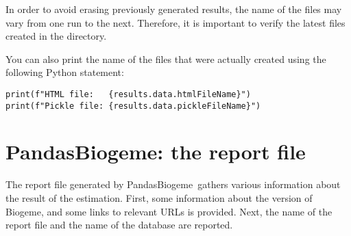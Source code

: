 \documentclass[12pt,a4paper]{article}
\newcommand{\PDBIOGEME}{PandasBiogeme}
\begin{document}
In order to avoid erasing previously generated results, the name of
the files may vary from one run to the next. Therefore,
it is important to verify the latest files created in the directory. 

You can also print the name of the files that were actually
created using the following Python statement:
\begin{lstlisting}
print(f"HTML file:   {results.data.htmlFileName}")
print(f"Pickle file: {results.data.pickleFileName}")
\end{lstlisting}
\clearpage

\section{\PDBIOGEME: the report file}
\label{sec:pythonreport}

The report file generated by \PDBIOGEME\ gathers various information
about the result of the estimation. First, some information about the
version of Biogeme, and some links to relevant URLs is provided. 
Next, the name of the report file and the name of the database  are reported. 
\end{document}
